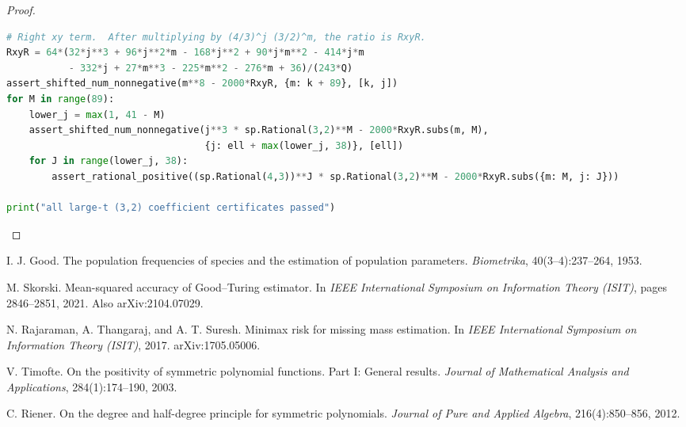 \documentclass[11pt]{article}
\theoremstyle{definition}
\begin{document}
\begin{proof}
\begin{lstlisting}[language=Python]
# Right xy term.  After multiplying by (4/3)^j (3/2)^m, the ratio is RxyR.
RxyR = 64*(32*j**3 + 96*j**2*m - 168*j**2 + 90*j*m**2 - 414*j*m
           - 332*j + 27*m**3 - 225*m**2 - 276*m + 36)/(243*Q)
assert_shifted_num_nonnegative(m**8 - 2000*RxyR, {m: k + 89}, [k, j])
for M in range(89):
    lower_j = max(1, 41 - M)
    assert_shifted_num_nonnegative(j**3 * sp.Rational(3,2)**M - 2000*RxyR.subs(m, M),
                                   {j: ell + max(lower_j, 38)}, [ell])
    for J in range(lower_j, 38):
        assert_rational_positive((sp.Rational(4,3))**J * sp.Rational(3,2)**M - 2000*RxyR.subs({m: M, j: J}))

print("all large-t (3,2) coefficient certificates passed")
\end{lstlisting}
\end{proof}


\begin{thebibliography}{99}
I. J. Good.
\newblock The population frequencies of species and the estimation of population parameters.
\newblock \emph{Biometrika}, 40(3--4):237--264, 1953.

M. Skorski.
\newblock Mean-squared accuracy of Good--Turing estimator.
\newblock In \emph{IEEE International Symposium on Information Theory (ISIT)},
  pages 2846--2851, 2021.  Also arXiv:2104.07029.

N. Rajaraman, A. Thangaraj, and A. T. Suresh.
\newblock Minimax risk for missing mass estimation.
\newblock In \emph{IEEE International Symposium on Information Theory (ISIT)},
  2017.  arXiv:1705.05006.

V. Timofte.
\newblock On the positivity of symmetric polynomial functions. Part I: General results.
\newblock \emph{Journal of Mathematical Analysis and Applications},
  284(1):174--190, 2003.

C. Riener.
\newblock On the degree and half-degree principle for symmetric polynomials.
\newblock \emph{Journal of Pure and Applied Algebra}, 216(4):850--856, 2012.
\end{thebibliography}
\end{document}
